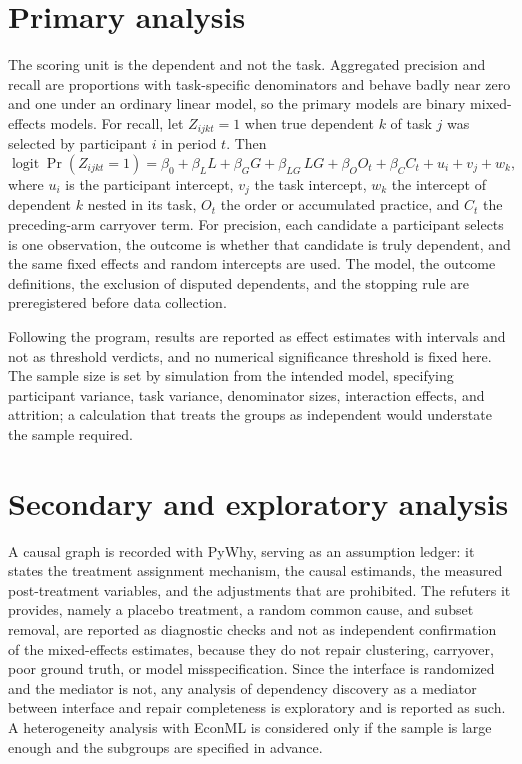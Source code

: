 \documentclass[11pt]{article}
\theoremstyle{definition}
\begin{document}
\section{Primary analysis}
\label{sec:analysis}

The scoring unit is the dependent and not the task. Aggregated precision and recall are proportions with task-specific denominators and behave badly near zero and one under an ordinary linear model, so the primary models are binary mixed-effects models. For recall, let $Z_{ijkt}=1$ when true dependent $k$ of task $j$ was selected by participant $i$ in period $t$. Then
\[
\operatorname{logit}\Pr(Z_{ijkt}=1)
=
\beta_0+\beta_L L+\beta_G G+\beta_{LG}\,LG
+\beta_O O_t+\beta_C C_t+u_i+v_j+w_k,
\]
where $u_i$ is the participant intercept, $v_j$ the task intercept, $w_k$ the intercept of dependent $k$ nested in its task, $O_t$ the order or accumulated practice, and $C_t$ the preceding-arm carryover term. For precision, each candidate a participant selects is one observation, the outcome is whether that candidate is truly dependent, and the same fixed effects and random intercepts are used. The model, the outcome definitions, the exclusion of disputed dependents, and the stopping rule are preregistered before data collection.

Following the program, results are reported as effect estimates with intervals and not as threshold verdicts, and no numerical significance threshold is fixed here. The sample size is set by simulation from the intended model, specifying participant variance, task variance, denominator sizes, interaction effects, and attrition; a calculation that treats the groups as independent would understate the sample required.

\section{Secondary and exploratory analysis}

A causal graph is recorded with PyWhy, serving as an assumption ledger: it states the treatment assignment mechanism, the causal estimands, the measured post-treatment variables, and the adjustments that are prohibited. The refuters it provides, namely a placebo treatment, a random common cause, and subset removal, are reported as diagnostic checks and not as independent confirmation of the mixed-effects estimates, because they do not repair clustering, carryover, poor ground truth, or model misspecification. Since the interface is randomized and the mediator is not, any analysis of dependency discovery as a mediator between interface and repair completeness is exploratory and is reported as such. A heterogeneity analysis with EconML is considered only if the sample is large enough and the subgroups are specified in advance.
\end{document}
